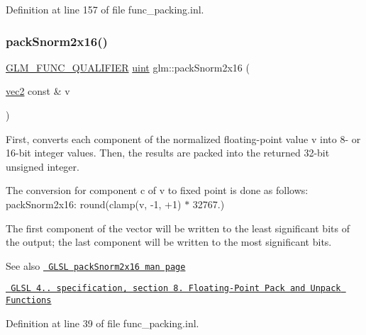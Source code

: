Definition at line 157 of file func\+\_\+packing.\+inl.

\mbox{\label{group__core__func__packing_ga0c8005de240d6c4ca3d16c7bee25c622}} 
\subsubsection{\texorpdfstring{packSnorm2x16()}{packSnorm2x16()}}
{\footnotesize\ttfamily \mbox{\hyperlink{setup_8hpp_a33fdea6f91c5f834105f7415e2a64407}{G\+L\+M\+\_\+\+F\+U\+N\+C\+\_\+\+Q\+U\+A\+L\+I\+F\+I\+ER}} \mbox{\hyperlink{group__core__precision_ga4fd29415871152bfb5abd588334147c8}{uint}} glm\+::pack\+Snorm2x16 (\begin{DoxyParamCaption}\item[{\mbox{\hyperlink{group__core__types_gaa1618f51db67eaa145db101d8c8431d8}{vec2}} const \&}]{v }\end{DoxyParamCaption})}

First, converts each component of the normalized floating-\/point value v into 8-\/ or 16-\/bit integer values. Then, the results are packed into the returned 32-\/bit unsigned integer.

The conversion for component c of v to fixed point is done as follows\+: pack\+Snorm2x16\+: round(clamp(v, -\/1, +1) $\ast$ 32767.)

The first component of the vector will be written to the least significant bits of the output; the last component will be written to the most significant bits.

\begin{DoxySeeAlso}{See also}
\href{http://www.opengl.org/sdk/docs/manglsl/xhtml/packSnorm2x16.xml}{\texttt{ G\+L\+SL pack\+Snorm2x16 man page}} 

\href{http://www.opengl.org/registry/doc/GLSLangSpec.4.20.8.pdf}{\texttt{ G\+L\+SL 4.. specification, section 8. Floating-\/\+Point Pack and Unpack Functions}} 
\end{DoxySeeAlso}


Definition at line 39 of file func\+\_\+packing.\+inl.

\mbox{\label{group__core__func__packing_gafcf25acc0d361c6c696a433aa5dfd16b}} 
